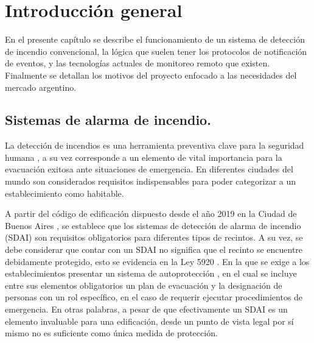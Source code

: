 
\chapter{Introducción general} %

\label{Chapter1} %
\label{IntroGeneral}


\newcommand{\keyword}[1]{\textbf{#1}}
\newcommand{\tabhead}[1]{\textbf{#1}}
\newcommand{\code}[1]{\texttt{#1}}
\newcommand{\file}[1]{\texttt{\bfseries#1}}
\newcommand{\option}[1]{\texttt{\itshape#1}}
\newcommand{\grados}{$^{\circ}$}


En el presente capítulo se describe el funcionamiento de un sistema de detección de incendio convencional, la lógica que suelen tener los protocolos de notificación de eventos, y las tecnologías actuales de monitoreo remoto que existen. Finalmente se detallan los motivos del proyecto enfocado a las necesidades del mercado argentino.  


\section{Sistemas de alarma de incendio.}
%
La detección de incendios es una herramienta preventiva clave para la seguridad humana \citep{rev_innov_1}, a su vez corresponde a un elemento de vital importancia para la evacuación exitosa ante situaciones de emergencia. En diferentes ciudades del mundo son considerados requisitos indispensables para poder categorizar a un establecimiento como habitable. 

A partir del código de edificación dispuesto desde el año 2019 en la Ciudad de Buenos Aires \citep{cod_edif}, se establece que los sistemas de detección de alarma de incendio (SDAI) son requisitos obligatorios para diferentes tipos de recintos. A su vez, se debe considerar que contar con un SDAI no significa que el recinto se encuentre debidamente protegido, esto se evidencia en la Ley 5920 \citep{ley_5920}. En la que se exige a los establecimientos presentar un sistema de autoprotección \citep{rev_innov_2}, en el cual se incluye entre sus elementos obligatorios un plan de evacuación y la designación de personas con un rol específico, en el caso de requerir ejecutar procedimientos de emergencia. En otras palabras, a pesar de que efectivamente un SDAI es un elemento invaluable para una edificación, desde un punto de vista legal por sí mismo no es suficiente como única medida de protección.  

